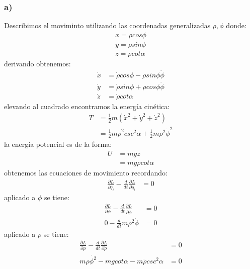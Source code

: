 \documentclass{article}
\begin{document}
\begin{tcolorbox}[breakable]
    \subsubsection*{a)}
    Describimos el moviminto utilizando las coordenadas generalizadas $\rho,\phi$ donde:
    \begin{align*}
        x = \rho cos\phi \\
        y = \rho sin\phi \\
        z = \rho cot\alpha
    \end{align*}
    derivando obtenemos:
    \begin{align*}
        \dot{x} &= \dot{\rho}cos\phi - \rho sin\phi \dot{\phi} \\
        \dot{y} &= \dot{\rho}sin\phi + \rho cos\phi \dot{\phi} \\
        \dot{z} &= \dot{\rho}cot\alpha
    \end{align*}
    elevando al cuadrado encontramos la energía cinética:
    \begin{align*}
        T 
        &= \frac{1}{2}m(\dot{x}^2+\dot{y}^2+\dot{z}^2) \\
        &= \frac{1}{2}m\dot{\rho}^2csc^2\alpha + \frac{1}{2}m\rho^2\dot{\phi}^2
    \end{align*}
    la energía potencial es de la forma:
    \begin{align*} 
        U 
        &= mgz \\
        &= mg\rho cot\alpha
    \end{align*}
    obtenemos las ecuaciones de movimiento recordando:
    \begin{align*}
        \frac{\partial L}{\partial q_i} - \frac{d}{dt}\frac{\partial L }{\partial \dot{q}_i} &= 0 
    \end{align*}
    aplicado a $\phi$ se tiene:
    \begin{align*}
        \frac{\partial L}{\partial \phi} - \frac{d}{dt}\frac{\partial L}{\partial \dot{\phi}} &= 0 \\ 
        0 - \frac{d}{dt}m\rho^2\dot{\phi} &= 0
    \end{align*}
    aplicado a $\rho$ se tiene:
    \begin{align*}
        \frac{\partial L}{\partial \rho} - \frac{d}{dt}\frac{\partial L}{\partial \dot{\rho}} &= 0 \\ 
        m\rho\dot{\phi^2} - mgcot\alpha - m\ddot{\rho}csc^2\alpha &= 0 
    \end{align*}

\end{tcolorbox}
\end{document}
